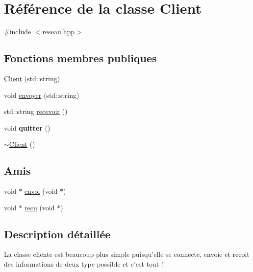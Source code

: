\hypertarget{classClient}{\section{Référence de la classe Client}
\label{classClient}
}


{\ttfamily \#include $<$reseau.\-hpp$>$}

\subsection*{Fonctions membres publiques}
\begin{DoxyCompactItemize}
\item 
\hyperlink{classClient_af7faf381e7062b0135ab53c35dbb5542}{Client} (std\-::string)
\item 
void \hyperlink{classClient_ababa7bdcba8521f9a696711446d47e04}{envoyer} (std\-::string)
\item 
std\-::string \hyperlink{classClient_a7ec691731f5b7d5accc7dcd9d585ad4d}{recevoir} ()
\item 
\hypertarget{classClient_a203aac6c2bb9ae7d140c62d7ae836718}{void {\bfseries quitter} ()}\label{classClient_a203aac6c2bb9ae7d140c62d7ae836718}

\item 
\hyperlink{classClient_a840e519ca781888cbd54181572ebe3a7}{$\sim$\-Client} ()
\end{DoxyCompactItemize}
\subsection*{Amis}
\begin{DoxyCompactItemize}
\item 
void $\ast$ \hyperlink{classClient_a748a40bc18d4ed6e2f98f1e9908f8711}{envoi} (void $\ast$)
\item 
void $\ast$ \hyperlink{classClient_aeaf2388f2f63df46fb9a90f59c34db91}{recu} (void $\ast$)
\end{DoxyCompactItemize}


\subsection{Description détaillée}
La classe cliente est beaucoup plus simple puisqu'elle se connecte, envoie et recoit des informations de deux type possible et c'est tout ! 

